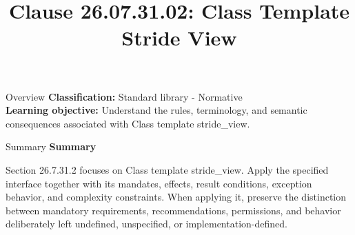 \documentclass[10pt,letterpaper]{article}
\title{Clause 26.07.31.02: Class Template Stride View}
\author{}
\date{}
\begin{document}
\maketitle
\begin{CornellOverviewBox}{Overview}
\textbf{Classification:} Standard library - Normative\\[2pt]
\textbf{Learning objective:} Understand the rules, terminology, and semantic consequences associated with Class template stride\_view.
\end{CornellOverviewBox}\begin{CornellSummaryBox}{Summary}
{\sffamily\bfseries\color{Accent} Summary}\par\vspace{3pt}Section 26.7.31.2 focuses on Class template stride\_view. Apply the specified interface together with its mandates, effects, result conditions, exception behavior, and complexity constraints. When applying it, preserve the distinction between mandatory requirements, recommendations, permissions, and behavior deliberately left undefined, unspecified, or implementation-defined.
\end{CornellSummaryBox}
\end{document}
